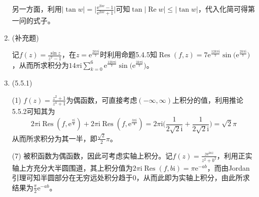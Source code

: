 \documentclass[a4paper,UTF8,fontset=windows]{ctexart}
\DeclareMathOperator{\re}{Re}
\DeclareMathOperator{\Res}{Res}
\begin{document}
\begin{enumerate}
    另一方面，利用$|\tan w|=\big|\frac{\mathrm{e}^{2\mathrm{i}w}-1}{\mathrm{e}^{2\mathrm{i}w}+1}\big|$可知$\tan|\re w|\le|\tan w|$，代入化简可得第一问的式子。
    
    \item (补充题)
    
    记$f(z)=\frac{\sin z}{z^7-1}$，在$z=\mathrm{e}^{\frac{2k\pi\mathrm{i}}{7}}$时利用命题5.4.5知$\Res(f,z)=7\mathrm{e}^{\frac{12k\pi\mathrm{i}}{7}}\sin\big(\mathrm{e}^{\frac{2k\pi\mathrm{i}}{7}}\big)$，从而所求积分为$14\pi\mathrm{i}\sum_{k=0}^6\mathrm{e}^{\frac{12k\pi\mathrm{i}}{7}}\sin\big(\mathrm{e}^{\frac{2k\pi\mathrm{i}}{7}}\big)$。
    
    \item (5.5.1)
    
    (1) $f(z)=\frac{z^2+1}{z^4+1}$为偶函数，可直接考虑$(-\infty,\infty)$上积分的值，利用推论5.5.2可知其为$$2\pi\mathrm{i}\Res(f,\mathrm{e}^{\frac{\pi\mathrm{i}}{4}})+2\pi\mathrm{i}\Res(f,\mathrm{e}^{\frac{3\pi\mathrm{i}}{4}})=2\pi\mathrm{i}\bigg(\frac{1}{2\sqrt2\mathrm{i}}+\frac{1}{2\sqrt2\mathrm{i}}\bigg)=\sqrt2\pi$$
    从而所求积分为其一半，即$\frac{\sqrt2}{2}\pi$。
    
    (7) 被积函数为偶函数，因此可考虑实轴上积分。记$f(z)=\frac{z\mathrm{e}^{\mathrm{i}az}}{z^2+b^2}$，利用正实轴上方充分大半圆围道，其上积分值为$2\pi\mathrm{i}\Res(f,b\mathrm{i})=\pi\mathrm{e}^{-ab}$，而由Jordan引理可知半圆部分在无穷远处积分趋于0，从而此即为实轴上积分，由此所求结果为$\frac{\pi}{2}\mathrm{e}^{-ab}$。
\end{enumerate}
\end{document}
